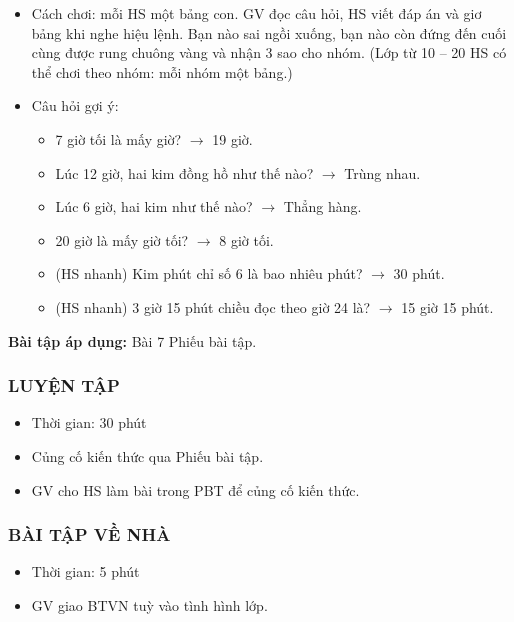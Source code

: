\documentclass[../main.tex]{subfiles}
\begin{document}
\begin{itemize}
    \item Cách chơi: mỗi HS một bảng con. GV đọc câu hỏi, HS viết đáp án và giơ bảng khi nghe hiệu lệnh. Bạn nào sai ngồi xuống, bạn nào còn đứng đến cuối cùng được rung chuông vàng và nhận 3 sao cho nhóm. (Lớp từ 10 -- 20 HS có thể chơi theo nhóm: mỗi nhóm một bảng.)
    \item Câu hỏi gợi ý:
    \begin{itemize}
        \item 7 giờ tối là mấy giờ? $\rightarrow$ 19 giờ.
        \item Lúc 12 giờ, hai kim đồng hồ như thế nào? $\rightarrow$ Trùng nhau.
        \item Lúc 6 giờ, hai kim như thế nào? $\rightarrow$ Thẳng hàng.
        \item 20 giờ là mấy giờ tối? $\rightarrow$ 8 giờ tối.
        \item (HS nhanh) Kim phút chỉ số 6 là bao nhiêu phút? $\rightarrow$ 30 phút.
        \item (HS nhanh) 3 giờ 15 phút chiều đọc theo giờ 24 là? $\rightarrow$ 15 giờ 15 phút.
    \end{itemize}
\end{itemize}
\textbf{Bài tập áp dụng:} Bài 7 Phiếu bài tập.

\subsubsection{LUYỆN TẬP}
\begin{hd}
    \begin{itemize}
        \item Thời gian: 30 phút
        \item Củng cố kiến thức qua Phiếu bài tập.
    \end{itemize}
\end{hd}
\begin{itemize}
    \item GV cho HS làm bài trong PBT để củng cố kiến thức.
\end{itemize}

\subsubsection{BÀI TẬP VỀ NHÀ}
\begin{hd}
    \begin{itemize}
        \item Thời gian: 5 phút
    \end{itemize}
\end{hd}
\begin{itemize}
    \item GV giao BTVN tuỳ vào tình hình lớp.
\end{itemize}
\end{document}
